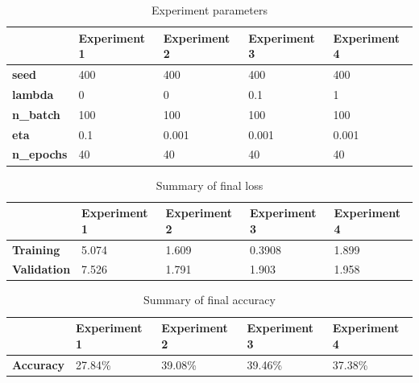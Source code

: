 \begin{table}[ht]
\begin{tabular}{|l|l|l|l|l|}
\hline
                   & \textbf{Experiment 1} & \textbf{Experiment 2} & \textbf{Experiment 3} & \textbf{Experiment 4} \\ \hline
\textbf{seed}      & 400                   & 400                   & 400                   & 400                   \\ \hline
\textbf{lambda}    & 0                     & 0                     & 0.1                   & 1                     \\ \hline
\textbf{n\_batch}  & 100                   & 100                   & 100                   & 100                   \\ \hline
\textbf{eta}       & 0.1                   & 0.001                 & 0.001                 & 0.001                 \\ \hline
\textbf{n\_epochs} & 40                    & 40                    & 40                    & 40                    \\ \hline
\end{tabular}
\caption{Experiment parameters}
\label{tab:experiment_parameters}
\end{table}

\begin{table}[ht]
\begin{tabular}{|l|l|l|l|l|}
\hline
                    & \textbf{Experiment 1} & \textbf{Experiment 2} & \textbf{Experiment 3} & \textbf{Experiment 4} \\ \hline
\textbf{Training}   & 5.074                 & 1.609                 & 0.3908                & 1.899                 \\ \hline
\textbf{Validation} & 7.526                 & 1.791                 & 1.903                 & 1.958                 \\ \hline
\end{tabular}
\caption{Summary of final loss}
\label{tab:summary_loss}
\end{table}

\begin{table}[ht]
\begin{tabular}{|l|l|l|l|l|}
\hline
                  & \textbf{Experiment 1} & \textbf{Experiment 2} & \textbf{Experiment 3} & \textbf{Experiment 4} \\ \hline
\textbf{Accuracy} & 27.84\%               & 39.08\%               & 39.46\%               & 37.38\%               \\ \hline
\end{tabular}
\caption{Summary of final accuracy}
\label{tab:summary_accuracy}
\end{table}

